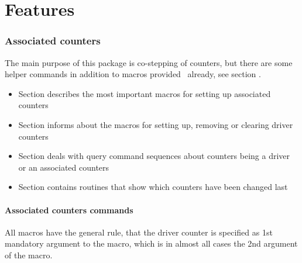 \documentclass[12pt,a4paper,oneside]{article}
\begin{document}
\clearpage
\part{Features}

\parttoc

\section{Associated counters}

The main purpose of this package is co-stepping of counters, but there are some helper commands in addition to macros provided \LaTeXe\ already, see section . 

\begin{itemize}
  \item Section  describes the most important macros for setting up associated counters
  \item Section  informs about the macros for setting up, removing or clearing driver counters
  \item Section  deals with query command sequences about counters being a driver or an associated counters
  \item Section  contains routines that show which counters have been changed last
\end{itemize}



\subsection[Association macros]{Associated counters commands}\label{subsection::associatedcounterscmds}

All macros have the general rule, that the driver counter is specified as 1st mandatory argument to the macro, which is in almost all cases the 2nd argument of the macro.
\end{document}
